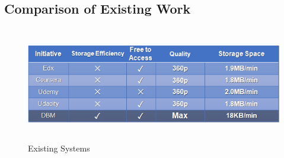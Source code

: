 \documentclass[12pt]{article}
\begin{document}
\subsection{Comparison of Existing Work}
\begin{figure}[h]
  \centering
  \includegraphics[width=14cm, height=5cm]{ExistingSystemsTable}
  \caption{Existing Systems}
\end{figure}
\end{document}
